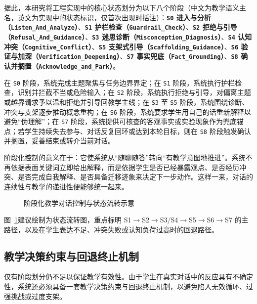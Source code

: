据此，本研究将工程实现中的核心状态划分为以下八个阶段（中文为教学语义主名，英文为实现中的状态标识，仅首次出现时括注）：\textbf{\texttt{S0} 进入与分析（\texttt{Listen\_And\_Analyze}）}、\textbf{\texttt{S1} 护栏检查（\texttt{Guardrail\_Check}）}、\textbf{\texttt{S2} 拒绝与引导（\texttt{Refusal\_And\_Guidance}）}、\textbf{\texttt{S3} 迷思诊断（\texttt{Misconception\_Diagnosis}）}、\textbf{\texttt{S4} 认知冲突（\texttt{Cognitive\_Conflict}）}、\textbf{\texttt{S5} 支架式引导（\texttt{Scaffolding\_Guidance}）}、\textbf{\texttt{S6} 验证与加深（\texttt{Verification\_Deepening}）}、\textbf{\texttt{S7} 事实兜底（\texttt{Fact\_Grounding}）}、\textbf{\texttt{S8} 确认并搁置（\texttt{Acknowledge\_and\_Park}）}。

在 \texttt{S0} 阶段，系统完成主题聚焦与任务边界界定；在 \texttt{S1} 阶段，系统执行护栏检查，识别并拦截不当或危险输入；在 \texttt{S2} 阶段，系统执行拒绝与引导，对偏离主题或越界请求予以温和拒绝并引导回教学主线；在 \texttt{S3} 至 \texttt{S5} 阶段，系统围绕诊断、冲突与支架逐步推动概念重构；在 \texttt{S6} 阶段，系统要求学生用自己的话重新解释以避免“伪理解”；在 \texttt{S7} 阶段，系统提供可核查的客观事实或实验现象作为兜底锚点；若学生持续失去参与、对话反复回环或达到本轮目标，则在 \texttt{S8} 阶段触发确认并搁置，妥善结束或转介当前对话。

阶段化控制的意义在于：它使系统从“随聊随答”转向“有教学意图地推进”。系统不再依据表面关键词立即给出解释，而是依据学生是否已经暴露观点、是否经历冲突、是否完成自我解释、是否具备迁移迹象来决定下一步动作。这样一来，对话的连续性与教学的递进性便能够统一起来。

\begin{figure}[htbp]
    \centering
    \caption{阶段化教学对话控制与状态流转示意}
    \label{fig:state-flow}
\end{figure}

图~\ref{fig:state-flow}建议绘制为状态流转图，重点标明 S1$\rightarrow$S2$\rightarrow$S3/S4$\rightarrow$S5$\rightarrow$S6$\rightarrow$S7 的主路径，以及在学生表达不足、冲突失败或认知负荷过高时的回退路径。

\subsection{教学决策约束与回退终止机制}
\label{sec:4.3.3}

仅有阶段划分仍不足以保证教学有效性。由于学生在真实对话中的反应具有不确定性，系统还必须具备一套教学决策约束与回退终止机制，以避免陷入无效循环、过强挑战或过度支架。


